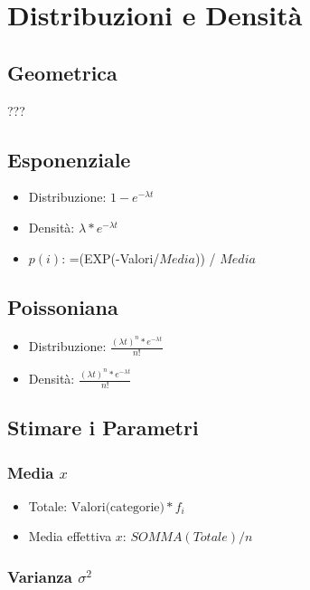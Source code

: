 \chapter{Distribuzioni e Densità}

\section{Geometrica}
???

\section{Esponenziale}

\begin{itemize}
    \item Distribuzione: $1 - e^{-\lambda t}$
    \item Densità: $\lambda * e^{-\lambda t}$
    \item $p(i)$: =(EXP(-Valori/$Media$)) / $Media$ %
\end{itemize}

\section{Poissoniana}

\begin{itemize}
    \item Distribuzione: $\frac{(\lambda t)^n * e^{-\lambda t}}{n!}$
    \item Densità: $\frac{(\lambda t)^n * e^{-\lambda t}}{n!}$
\end{itemize}

\section{Stimare i Parametri}

\subsection{Media \texorpdfstring{$x$}{x}}

\begin{itemize}
    \item Totale: $\text{Valori(categorie)} * f_i$
    \item Media effettiva $x$: $SOMMA(Totale) / n$ %
\end{itemize}

\subsection{Varianza \texorpdfstring{$\sigma^2$}{sigma quadro}}